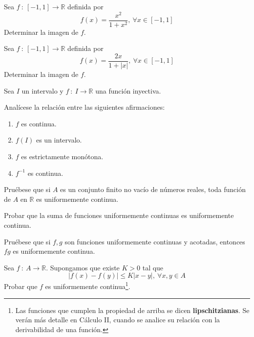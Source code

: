 \begin{ejercicio}
    Sea $f ~:~ [-1,1] \longrightarrow \mathbb{R}$ definida por
    \begin{equation*}
        f(x) = \frac{x^2}{1+x^2}, ~ \forall x \in [-1,1]
    \end{equation*}
    Determinar la imagen de $f$.
\end{ejercicio}

\begin{ejercicio}
    Sea $f ~:~ [-1,1] \longrightarrow \mathbb{R}$ definida por
    \begin{equation*}
        f(x) = \frac{2x}{1+|x|}, ~ \forall x \in [-1,1]
    \end{equation*}
    Determinar la imagen de $f$.
\end{ejercicio}

\begin{ejercicio}
    Sea $I$ un intervalo y $f ~:~ I \longrightarrow \mathbb{R}$ una función inyectiva.

    Analícese la relación entre las siguientes afirmaciones:
    \begin{enumerate}
        \item $f$ es continua.
        \item $f(I)$ es un intervalo.
        \item $f$ es estrictamente monótona.
        \item $f^{-1}$ es continua.
    \end{enumerate}
\end{ejercicio}

\begin{ejercicio}
    Pruébese que si $A$ es un conjunto finito no vacío de números reales, toda función de $A$ en $\mathbb{R}$ es uniformemente continua.
\end{ejercicio}

\begin{ejercicio}
    Probar que la suma de funciones uniformemente continuas es uniformemente continua.
\end{ejercicio}

\begin{ejercicio}
    Pruébese que si $f,g$ son funciones uniformemente continuas y acotadas, entonces $fg$ es uniformemente continua.
\end{ejercicio}

\begin{ejercicio}
    Sea $f ~:~ A \longrightarrow \mathbb{R}$. Supongamos que existe $K > 0$ tal que
    \begin{equation*}
        |f(x)-f(y)| \leq K |x-y|, ~ \forall x,y \in A
    \end{equation*}
    Probar que $f$ es uniformemente continua\footnote{Las funciones que cumplen la propiedad de arriba se dicen \textbf{lipschitzianas}.
    Se verán más detalle en Cálculo II, cuando se analice su relación con la derivabilidad de una función.}.
\end{ejercicio}

